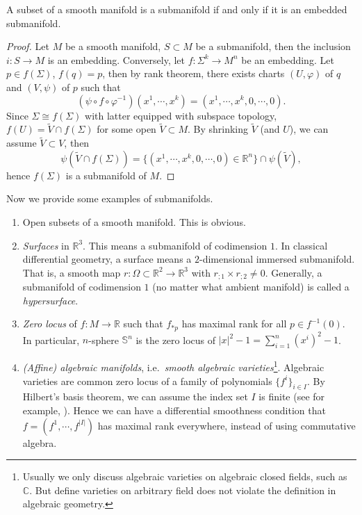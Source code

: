\begin{prop}
    A subset of a smooth manifold is a submanifold if and only if it is an embedded submanifold.
\end{prop}
\begin{proof}
    Let $M$ be a smooth manifold, $S\subset M$ be a submanifold, then the inclusion $i:S\to M$ is an embedding.
    Conversely, let $f:\Sigma^k\to M^n$ be an embedding.
    Let $p\in f(\Sigma)$, $f(q)=p$, then by rank theorem, there exists charts $(U,\varphi)$ of $q$ and $(V,\psi)$ of $p$ such that
    \[(\psi\circ f\circ\varphi^{-1})(x^1,\cdots,x^k)=(x^1,\cdots,x^k,0,\cdots,0).\]
    Since $\Sigma\cong f(\Sigma)$ with latter equipped with subspace topology, $f(U)=\tilde{V}\cap f(\Sigma)$ for some open $\tilde{V}\subset M$.
    By shrinking $\tilde{V}$ (and $U$), we can assume $\tilde{V}\subset V$, then
    \[\psi(\tilde{V}\cap f(\Sigma))=\{(x^1,\cdots,x^k,0,\cdots,0)\in\mathbb{R}^n\}\cap\psi(\tilde{V}),\]
    hence $f(\Sigma)$ is a submanifold of $M$.
\end{proof}

Now we provide some examples of submanifolds.
\begin{eg}
    \begin{enumerate}[(1)]
        \item Open subsets of a smooth manifold.
        This is obvious.
        \item \emph{Surfaces} in $\mathbb{R}^3$.
        This means a submanifold of codimension $1$.
        In classical differential geometry, a surface means a $2$-dimensional immersed submanifold.
        That is, a smooth map $r:\Omega\subset\mathbb{R}^2\to\mathbb{R}^3$ with $r_{;1}\times r_{;2}\neq 0$.
        Generally, a submanifold of codimension $1$ (no matter what ambient manifold) is called a \emph{hypersurface}.
        \item \emph{Zero locus} of $f:M\to\mathbb{R}$ such that $f_{*p}$ has maximal rank for all $p\in f^{-1}(0)$.
        In particular, $n$-sphere $\mathbb{S}^n$ is the zero locus of $|x|^2-1=\sum_{i=1}^n(x^i)^2-1$.
        \item \emph{(Affine) algebraic manifolds}, i.e.\ \emph{smooth algebraic varieties}\footnote{Usually we only discuss algebraic varieties on algebraic closed fields, such as $\mathbb{C}$. But define varieties on arbitrary field does not violate the definition in algebraic geometry.}.
        Algebraic varieties are common zero locus of a family of polynomials $\{f^i\}_{i\in I}$.
        By Hilbert's basis theorem, we can assume the index set $I$ is finite (see for example, \cite[Theorem~B-1.16]{Rotman}).
        Hence we can have a differential smoothness condition that $f=(f^1,\cdots,f^{|I|})$ has maximal rank everywhere, instead of using commutative algebra.
    \end{enumerate}
\end{eg}


